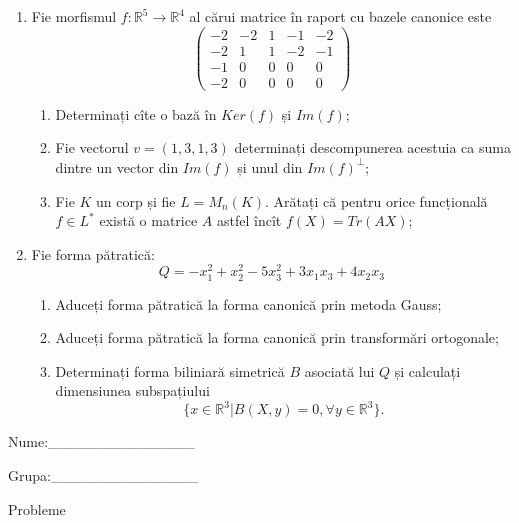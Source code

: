 \documentclass{article}
\begin{document}
\begin{enumerate}
 \item Fie morfismul $f:\mathbb{R}^5 \to \mathbb{R}^4$ al cărui matrice în raport cu bazele canonice este
$$\begin{pmatrix}
-2&-2&1&-1&-2\\
-2&1&1&-2&-1\\
-1&0&0&0&0\\
-2&0&0&0&0
\end{pmatrix}$$

\begin{enumerate}
\item Determinați cîte o bază în $Ker(f)$ și $Im(f)$;
\item Fie vectorul $v=(1,3,1,3)$ determinați descompunerea acestuia ca suma dintre un vector din $Im(f)$ și unul din $Im(f)^\perp$;
\item Fie $K$ un corp și fie $L=M_n(K)$. Arătați că pentru orice funcțională $f \in L^*$ există o matrice $A$ astfel încît $f(X)=Tr(AX)$;
\end{enumerate}
\item Fie forma pătratică:
$$Q= -x_1^2+x_2^2-5x_3^2+3x_1x_3+4x_2x_3$$

\begin{enumerate}
\item Aduceți forma pătratică la forma canonică prin metoda Gauss;
\item Aduceți forma pătratică la forma canonică prin transformări ortogonale;
\item Determinați forma biliniară simetrică $B$ asociată lui $Q$ și calculați dimensiunea subspațiului
$$\{x \in \mathbb{R}^3 | B(X,y)=0,\forall y \in \mathbb{R}^3\}.$$

\end{enumerate}
\end{enumerate}
\newpage
\begin{flushright}
Nume:\_\_\_\_\_\_\_\_\_\_\_\_\_\_
 
 
Grupa:\_\_\_\_\_\_\_\_\_\_\_\_\_\_
\end{flushright}
\begin{center}
\vspace{2cm}
{\Large Probleme}
\vspace{2cm}
\end{center}
\end{document}

